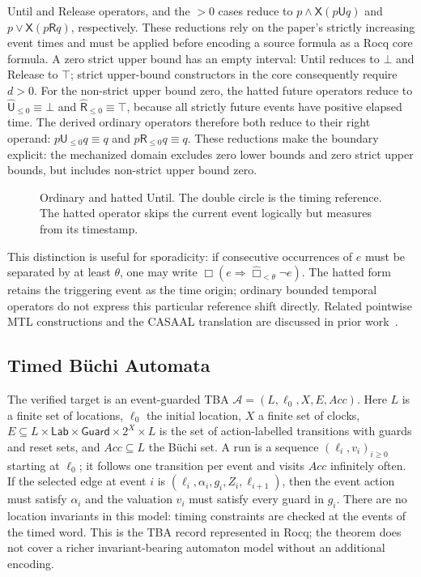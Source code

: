 \documentclass[10pt,journal,compsoc]{IEEEtran}
\newcommand{\Until}{\mathbin{\mathsf{U}}}
\newcommand{\Release}{\mathbin{\mathsf{R}}}
\newcommand{\hUntil}{\mathbin{\widehat{\mathsf{U}}}}
\newcommand{\hRelease}{\mathbin{\widehat{\mathsf{R}}}}
\newcommand{\Next}{\mathsf{X}}
\begin{document}
Until and Release operators, and the $>0$ cases reduce to
$p\land\Next(p\Until q)$ and $p\lor\Next(p\Release q)$,
respectively. These reductions rely on the paper's strictly increasing event
times and must be applied before encoding a source formula as a Rocq core
formula. A zero strict
upper bound has an empty interval: Until reduces to $\bot$ and Release to
$\top$; strict upper-bound constructors in the core consequently require
$d>0$. For the non-strict upper bound zero, the hatted future operators reduce
to $\hUntil_{\le0}\equiv\bot$ and $\hRelease_{\le0}\equiv\top$, because all
strictly future events have positive elapsed time. The derived ordinary
operators therefore both reduce to their right operand:
$p\Until_{\le0}q\equiv q$ and $p\Release_{\le0}q\equiv q$. These reductions
make the boundary explicit: the mechanized domain excludes zero lower bounds
and zero strict upper bounds, but includes non-strict upper bound zero.

\begin{figure}[t]
\centering

\caption{Ordinary and hatted Until. The double circle is the timing reference.
The hatted operator skips the current event logically but measures from its
timestamp.}
\label{fig:hatted-until}
\end{figure}

This distinction is useful for sporadicity: if consecutive occurrences of
$e$ must be separated by at least $\theta$, one may write
$\Box(e\Rightarrow\widehat{\Box}_{<\theta}\neg e)$. The hatted form retains
the triggering event as the time origin; ordinary bounded temporal
operators do not express this particular reference shift directly.
Related pointwise MTL constructions and the CASAAL translation are discussed
in prior work~\cite{ouaknine_worrell_lics05,bouyer_chevalier_markey_fsttcs05,li_spin7,casaal_tool}.

\subsection{Timed B\"uchi Automata}
\label{sec:tba}
The verified target is an event-guarded TBA
$\mathcal A=(L,\ell_0,X,E,\mathit{Acc})$. Here $L$ is a finite set of
locations, $\ell_0$ the initial location, $X$ a finite set of clocks,
$E\subseteq L\times\mathsf{Lab}\times\mathsf{Guard}\times 2^X\times L$
is the set of action-labelled transitions with guards and reset sets, and
$\mathit{Acc}\subseteq L$ the B\"uchi set. A run is a sequence
$(\ell_i,v_i)_{i\ge0}$ starting at $\ell_0$; it follows one transition per
event and visits $\mathit{Acc}$ infinitely often. If the selected edge at
event $i$ is $(\ell_i,\alpha_i,g_i,Z_i,\ell_{i+1})$, then the event action
must satisfy $\alpha_i$ and the valuation $v_i$ must satisfy every guard in
$g_i$. There are no location invariants in this model: timing constraints
are checked at the events of the timed word. This is the TBA record
represented in Rocq; the theorem does not cover a richer invariant-bearing
automaton model without an additional encoding.
\end{document}
